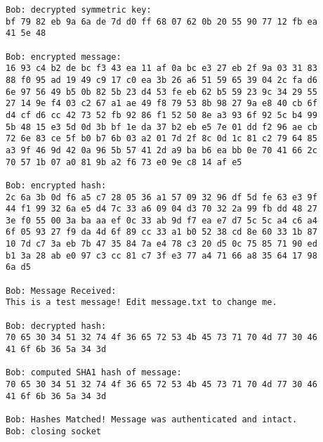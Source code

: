 \documentclass[letterpaper,12pt]{article} \usepackage{fullpage}
\begin{document}
\begin{itemize}
{\begin{verbatim}
Bob: decrypted symmetric key: 
bf 79 82 eb 9a 6a de 7d d0 ff 68 07 62 0b 20 55 90 77 12 fb ea 
41 5e 48

Bob: encrypted message: 
16 93 c4 b2 de bc f3 43 ea 11 af 0a bc e3 27 eb 2f 9a 03 31 83 
88 f0 95 ad 19 49 c9 17 c0 ea 3b 26 a6 51 59 65 39 04 2c fa d6 
6e 97 56 49 b5 0b 82 5b 23 d4 53 fe eb 62 b5 59 23 9c 34 29 55 
27 14 9e f4 03 c2 67 a1 ae 49 f8 79 53 8b 98 27 9a e8 40 cb 6f 
d4 cf d6 cc 42 73 52 fb 92 86 f1 52 50 8e a3 93 6f 92 5c b4 99 
5b 48 15 e3 5d 0d 3b bf 1e da 37 b2 eb e5 7e 01 dd f2 96 ae cb 
72 6e 83 ce 5f b0 b7 6b 03 a2 01 7d 2f 8c 0d 1c 81 c2 79 64 85 
a3 9f 46 9d 42 0a 96 5b 57 41 2d a9 ba b6 ea bb 0e 70 41 66 2c 
70 57 1b 07 a0 81 9b a2 f6 73 e0 9e c8 14 af e5

Bob: encrypted hash: 
2c 6a 3b 0d f6 a5 c7 28 05 36 a1 57 09 32 96 df 5d fe 63 e3 9f 
44 f1 99 32 6a e5 d4 7c 33 a6 09 04 d3 70 32 2a 99 fb dd 48 27 
3e f0 55 00 3a ba aa ef 0c 33 ab 9d f7 ea e7 d7 5c 5c a4 c6 a4 
6f 05 93 27 f9 da 4d 6f 89 cc 33 a1 b0 52 38 cd 8e 60 33 1b 87 
10 7d c7 3a eb 7b 47 35 84 7a e4 78 c3 20 d5 0c 75 85 71 90 ed 
b1 3a 28 ab e0 97 c3 cc 81 c7 3f e3 77 a4 71 66 a8 35 64 17 98 
6a d5

Bob: Message Received: 
This is a test message! Edit message.txt to change me.

Bob: decrypted hash: 
70 65 30 34 51 32 74 4f 36 65 72 53 4b 45 73 71 70 4d 77 30 46 
41 6f 6b 36 5a 34 3d

Bob: computed SHA1 hash of message: 
70 65 30 34 51 32 74 4f 36 65 72 53 4b 45 73 71 70 4d 77 30 46 
41 6f 6b 36 5a 34 3d

Bob: Hashes Matched! Message was authenticated and intact.
Bob: closing socket
            \end{verbatim}
    }
        
\end{itemize}
\end{document}
